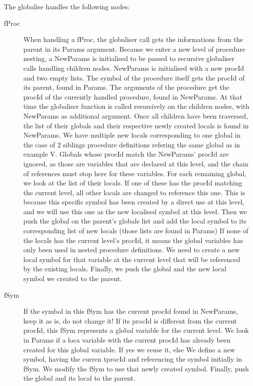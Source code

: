\documentclass[draft,a4paper]{memoir}
\begin{document}
The globalise handles the following nodes:
\begin{description}
   \item[fProc] When handling a fProc, the globaliser call gets the informations from the parent in its Params argument. Because we enter a new level of procedure nesting, a NewParams is initialised to be passed to recursive globaliser calls handling children nodes. NewParams is initialised with a new procId and two empty lists. 
      The symbol of the procedure itself gets the procId of its parent, found in Params. The arguments of the procedure get the procId of the currently handled procedure, found in NewParams. At that time the globaliser function is called resursively on the children nodes, with NewParams as additional argument.
      Once all children have been traversed, the list of their globals and their respective newly created locals is found in NewParams.  We have multiple new locals corresponding to one global in the case of 2 siblings procedure definitions refering the same global as in example V. 
      Globals whose procId match the NewParams' procId are ignored, as those are variables that are declared at this level, and the chain of references must stop here for these variables.
      For each remaining global, we look at the list of their locals. 
      If one of these has the procId matching the current level, all other locals are changed to reference this one. This is because this specific symbol has been created by a direct use at this level, and we will use this one as the new localised symbol at this level. Then we push the global on the parent's globals list and add the local symbol to its corresponding list of new locals (those lists are found in Params)
      If none of the locals has the current level's procId, it means the global variables has only been used in nested procedure definitions. We need to create a new local symbol for that variable at the current level that will be referenced by the existing locals. Finally, we push the global and the new local symbol we created to the parent. 
   \item[fSym] If the symbol in this fSym has the current procId found in NewParams, keep it as is, do not change it! 
      If its procId is different from the current procId, this fSym represents a global variable for the current level. We look in Params if a loca variable with the current procId has already been created for this global variable. If yes we reuse it, else We define a new symbol, having the curren tprocId and referencing the symbol initially in fSym. We modify the fSym to use that newly created symbol. Finally, push the global and its local to the parent.
      
\end{description}
\end{document}
